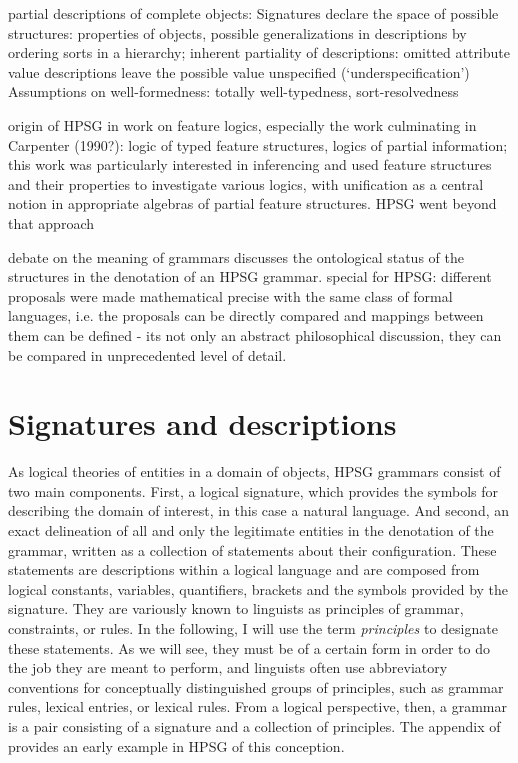 \documentclass[output=paper
                ,modfonts
                ,nonflat
	        ,collection
	        ,collectionchapter
	        ,collectiontoclongg
 	        ,biblatex
                ,babelshorthands
                ,newtxmath
                ,draftmode
                ,colorlinks, citecolor=brown
]{./langsci/langscibook}
\begin{document}
{{partial descriptions of complete objects:
Signatures declare the space of possible structures: properties of objects, possible generalizations in descriptions by ordering sorts in a hierarchy; inherent partiality of descriptions: omitted attribute value descriptions leave the possible value unspecified (`underspecification')
Assumptions on well-formedness: totally well-typedness, sort-resolvedness

origin of HPSG in work on feature logics, especially the work culminating in Carpenter (1990?): logic of typed feature structures, logics of partial information; this work was particularly interested in inferencing and used feature structures and their properties to investigate various logics, with unification as a central notion in appropriate algebras of partial feature structures. HPSG went beyond that approach

debate on the meaning of grammars discusses the ontological status of the structures in the denotation of an HPSG grammar. special for HPSG: different proposals were made mathematical precise with the same class of formal languages, i.e. the proposals can be directly compared and mappings between them can be defined - its not only an abstract philosophical discussion, they can be compared in unprecedented level of detail.


\section{Signatures and descriptions}
\label{sec-signatures}

As logical theories of entities in a domain of objects, HPSG grammars
consist of two main components. First, a logical signature, which
provides the symbols for describing the domain of interest, in this
case a natural language. And second, an exact delineation of all and
only the legitimate entities in the denotation of the grammar, written
as a collection of statements about their configuration. These statements are
descriptions within a logical language and are composed from logical
constants, variables, quantifiers, brackets and the symbols provided
by the signature. They are variously known to linguists as principles
of grammar, constraints, or rules. In the following, I will use the
term \emph{principles} to designate these statements.
As we will see, they must be of a certain form in order to do the job
they are meant to perform, and linguists often use abbreviatory
conventions for conceptually distinguished groups of principles, such
as grammar rules, lexical entries, or lexical rules. From a logical
perspective,
then, a grammar is a pair consisting of a signature and a collection
of principles.  The appendix of \citet{PollardSag1994} provides an
early example in HPSG of this conception.

}}
\end{document}
